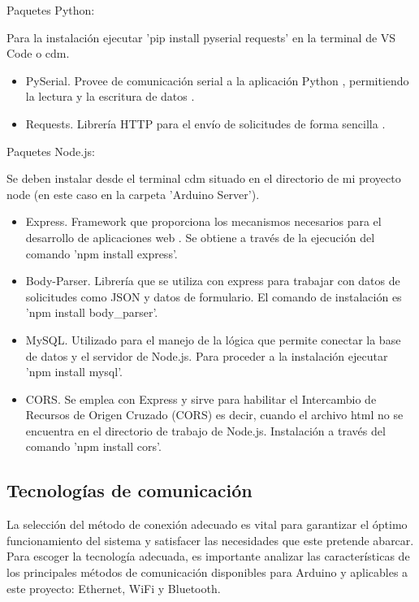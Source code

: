 Paquetes Python:

Para la instalación ejecutar 'pip install pyserial requests' en la terminal de VS Code o cdm.
\begin{itemize}
    \item PySerial. Provee de comunicación serial a la aplicación Python , permitiendo la lectura y la escritura de datos \cite{pyserial96:online}.
    \item Requests. Librería HTTP para el envío de solicitudes de forma sencilla \cite{psfreque89:online}.
\end{itemize}

Paquetes Node.js:

Se deben instalar desde el terminal cdm situado en el directorio de mi proyecto node (en este caso en la carpeta 'Arduino Server').
\begin{itemize}
    \item Express. Framework que proporciona los mecanismos necesarios para el desarrollo de aplicaciones web \cite{Express10:online}. Se obtiene a través de la ejecución del comando 'npm install express'.
    \item Body-Parser. Librería que se utiliza con express para trabajar con datos de solicitudes como JSON y datos de formulario. El comando de instalación es 'npm install body\_parser'.
    \item MySQL. Utilizado para el manejo de la lógica que permite conectar la base de datos y el servidor de Node.js. Para proceder a la instalación ejecutar 'npm install mysql'.
    \item CORS. Se emplea con Express y sirve para habilitar el Intercambio de Recursos de Origen Cruzado (CORS) \cite{Intercam91:online} es decir, cuando el archivo html no se encuentra en el directorio de trabajo de Node.js. Instalación a través del comando 'npm install cors'.
\end{itemize}

\subsection{Tecnologías de comunicación}
La selección del método de conexión adecuado es vital para garantizar el óptimo funcionamiento del sistema y satisfacer las necesidades que este pretende abarcar. Para escoger la tecnología adecuada, es importante analizar las características de los principales métodos de comunicación disponibles para Arduino y aplicables a este proyecto: Ethernet, WiFi y Bluetooth.


